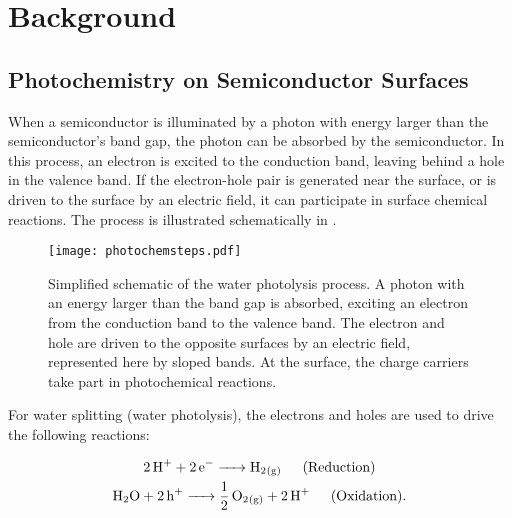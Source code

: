 \chapter{Background}
\label{ch:background}




\section{Photochemistry on Semiconductor Surfaces}
\label{sec:background.semiconductorphotochem}


When a semiconductor is illuminated by a photon with energy larger than the 
semiconductor's band gap, the photon can be absorbed by the semiconductor.
\cite{Morrison:1980va} In this process, an electron is excited to the 
conduction band, leaving behind a hole in the valence band. If the 
electron-hole pair is generated near the surface, or is driven to the 
surface by an electric field, it can participate in surface chemical 
reactions. The process is illustrated schematically in 
.

\begin{figure}
	\centering
	\texttt{[image: photochemsteps.pdf]}
	\caption[Simplified schematic of the water photolysis process]{%
		Simplified schematic of the water photolysis process. A photon 
		with an energy larger than the band gap is absorbed, exciting 
		an electron from the conduction band to the valence band. The 
		electron and hole are driven to the opposite surfaces by an 
		electric field, represented here by sloped bands. At the surface, 
		the charge carriers take part in photochemical reactions.}
	\label{fig:photochemsteps}
\end{figure}

For water splitting (water photolysis),\cite{memming2001semiconductor} the 
electrons and holes are used to drive the following reactions:

\begin{gather}

	\ce{2H+ + 2e^{-} -> H2_{(g)}} \hspace{1.5em} \text{(Reduction)}\\
	\ce{H2O + 2h+ -> 1/2O2_{(g)} + 2H+} \hspace{1.5em} \text{(Oxidation).}
	
\end{gather}

